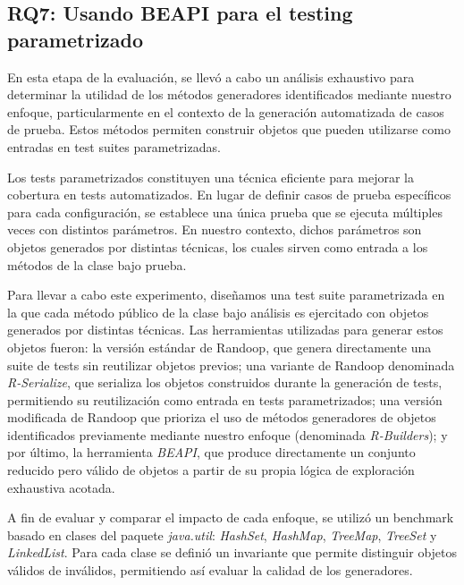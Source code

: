

\subsection{RQ7: Usando BEAPI para el testing parametrizado}
\label{sec:parametrizedTesting}

En esta etapa de la evaluación, se llevó a cabo un análisis exhaustivo para determinar la 
utilidad de los métodos generadores identificados mediante nuestro enfoque, particularmente 
en el contexto de la generación automatizada de casos de prueba. Estos métodos permiten construir 
objetos que pueden utilizarse como entradas en test suites parametrizadas.

Los tests parametrizados constituyen una técnica eficiente para mejorar la cobertura en tests 
automatizados. En lugar de definir casos de prueba específicos para cada configuración, se 
establece una única prueba que se ejecuta múltiples veces con distintos parámetros. En nuestro 
contexto, dichos parámetros son objetos generados por distintas técnicas, los cuales sirven como 
entrada a los métodos de la clase bajo prueba.

Para llevar a cabo este experimento, diseñamos una test suite parametrizada en la que cada método 
público de la clase bajo análisis es ejercitado con objetos generados por distintas técnicas. Las 
herramientas utilizadas para generar estos objetos fueron: la versión estándar de Randoop, que 
genera directamente una suite de tests sin reutilizar objetos previos; una variante de Randoop 
denominada \emph{R-Serialize}, que serializa los objetos construidos durante la generación de 
tests, permitiendo su reutilización como entrada en tests parametrizados; una versión modificada 
de Randoop que prioriza el uso de métodos generadores de objetos identificados previamente mediante 
nuestro enfoque (denominada \emph{R-Builders}); y por último, la herramienta \emph{BEAPI}, que 
produce directamente un conjunto reducido pero válido de objetos a partir de su propia lógica de 
exploración exhaustiva acotada.

A fin de evaluar y comparar el impacto de cada enfoque, se utilizó un benchmark basado en clases 
del paquete \emph{java.util}: \emph{HashSet}, \emph{HashMap}, \emph{TreeMap}, \emph{TreeSet} y \emph{LinkedList}.
Para cada clase se definió un invariante que permite distinguir objetos válidos de inválidos, permitiendo así evaluar la calidad de los generadores.

